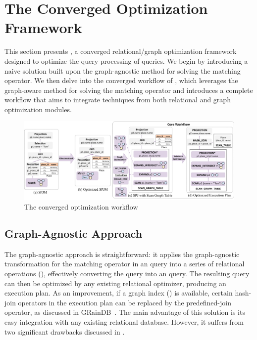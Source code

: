 \section{The Converged Optimization Framework}
\label{sec:optimizations}
This section presents \name, a converged relational/graph optimization framework designed to optimize the query
processing of \spjm queries. We begin by introducing a naive solution built upon the graph-agnostic
method for solving the matching operator. We then delve into the converged workflow of \name, which leverages the graph-aware method for solving the matching operator and introduces a complete workflow that aims to integrate techniques from both relational and graph optimization modules.



\begin{figure}
    \centering
    \includegraphics[width=.95\linewidth]{./figures/workflow.pdf}
    \caption{The converged optimization workflow}
    \label{fig:framework-workflow}
\end{figure}



\subsection{Graph-Agnostic Approach}
\label{sec:relational-only}
The graph-agnostic approach is straightforward: it applies the graph-agnostic transformation for the matching operator in an \spjm query into a series of relational operations (), effectively converting the \spjm query into an \spj query. The resulting \spj query can then be optimized by any existing relational optimizer, producing an execution plan. As an improvement, if a graph index () is available, certain hash-join operators in the execution plan can be replaced by the predefined-join operator, as discussed in GRainDB~\cite{graindb}. The main advantage of this solution is its easy integration with any existing relational database. However, it suffers from two significant drawbacks discussed in .

